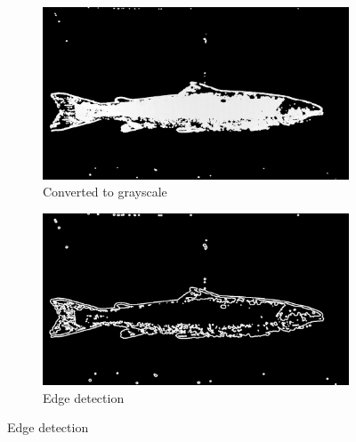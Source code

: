 \begin{figure}[H]
    \begin{subfigure}{0.48\textwidth}
        \includegraphics[width=\linewidth]{images/implementation/4_1_grayscale}
        \caption{Converted to grayscale} 
        \label{fig:grayscale}
    \end{subfigure}\hspace*{\fill}
    \begin{subfigure}{0.48\textwidth}
        \includegraphics[width=\linewidth]{images/implementation/4_2_edge_detector}
        \caption{Edge detection} 
        \label{fig:edge_detection}
    \end{subfigure}
    

\end{figure}
